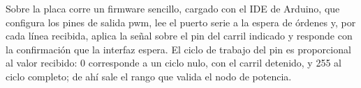 Sobre la placa corre un firmware sencillo, cargado con el IDE de Arduino, que configura los pines de salida \gls{pwm}, lee el puerto serie a la espera de órdenes y, por cada línea recibida, aplica la señal sobre el pin del carril indicado y responde con la confirmación que la interfaz espera. El ciclo de trabajo del pin es proporcional al valor recibido: 0 corresponde a un ciclo nulo, con el carril detenido, y 255 al ciclo completo; de ahí sale el rango que valida el nodo de potencia.

